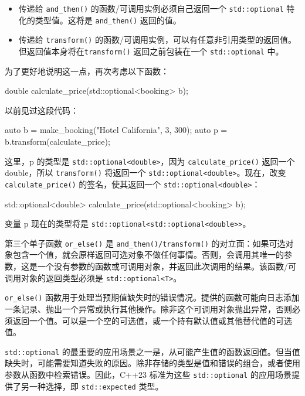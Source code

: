 \begin{itemize}
\item
传递给 \verb|and_then()| 的函数/可调用实例必须自己返回一个 \verb|std::optional| 特化的类型值。这将是 \verb|and_then()| 返回的值。

\item
传递给 \verb|transform()| 的函数/可调用实例，可以有任意非引用类型的返回值。但返回值本身将在\verb|transform()| 返回之前包装在一个 \verb|std::optional| 中。
\end{itemize}

为了更好地说明这一点，再次考虑以下函数：

\begin{cpp}
double calculate_price(std::optional<booking> b);
\end{cpp}

以前见过这段代码：

\begin{cpp}
auto b = make_booking("Hotel California", 3, 300);
auto p = b.transform(calculate_price);
\end{cpp}

这里，p 的类型是 \verb|std::optional<double>|，因为 \verb|calculate_price()| 返回一个 double，所以 \verb|transform()| 将返回一个 \verb|std::optional<double>|。现在，改变 \verb|calculate_price()| 的签名，使其返回一个 \verb|std::optional<double>|：

\begin{cpp}
std::optional<double> calculate_price(std::optional<booking> b);
\end{cpp}

变量 p 现在的类型将是 \verb|std::optional<std::optional<double>>|。

第三个单子函数 \verb|or_else()| 是 \verb|and_then()/transform()| 的对立面：如果可选对象包含一个值，就会原样返回可选对象不做任何事情。否则，会调用其唯一的参数，这是一个没有参数的函数或可调用对象，并返回此次调用的结果。该函数/可调用对象的返回类型必须是 \verb|std::optional<T>|。

\verb|or_else()| 函数用于处理当预期值缺失时的错误情况。提供的函数可能向日志添加一条记录、抛出一个异常或执行其他操作。除非这个可调用对象抛出异常，否则必须返回一个值。可以是一个空的可选值，或一个持有默认值或其他替代值的可选值。


\verb|std::optional| 的最重要的应用场景之一是，从可能产生值的函数返回值。但当值缺失时，可能需要知道失败的原因。除非存储的类型是值和错误的组合，或者使用参数从函数中检索错误。因此，C++23 标准为这些 \verb|std::optional| 的应用场景提供了另一种选择，即 \verb|std::expected| 类型。

